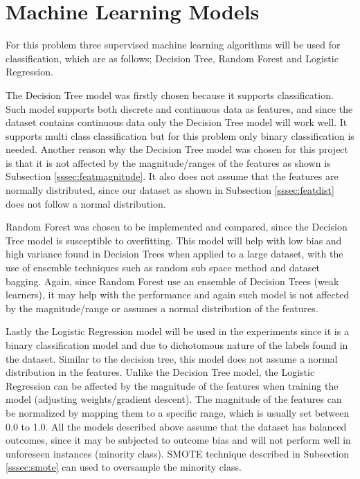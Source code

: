 \section{Machine Learning Models}\label{ssec:proposedmodels}
For this problem three supervised machine learning algorithms will be used for classification, which are as follows; Decision Tree, Random Forest and Logistic Regression.

\noindent The Decision Tree model was firstly chosen because it supports classification. Such model supports both discrete and continuous data as features, and since the dataset contains continuous data only the Decision Tree model will work well. It supports multi class classification but for this problem only binary classification is needed. Another reason why the Decision Tree model was chosen for this project is that it is not affected by the magnitude/ranges of the features as shown is Subsection \ref{sssec:featmagnitude}.  It also does not assume that the features are normally distributed, since our dataset as shown in Subsection \ref{sssec:featdist} does not follow a normal distribution. 

\noindent Random Forest was chosen to be implemented and compared, since the Decision Tree model is susceptible to overfitting. This model will help with low bias and high variance found in Decision Trees when applied to a large dataset, with the use of ensemble techniques such as random sub space method and dataset bagging. Again, since Random Forest use an ensemble of Decision Trees (weak learners), it may help with the performance and again such model is not affected by the magnitude/range or assumes a normal distribution of the features. 

\noindent Lastly the Logistic Regression model will be used in the experiments since it is a binary classification model and due to dichotomous nature of the labels found in the dataset. Similar to the decision tree, this model does not assume a normal distribution in the features. Unlike the Decision Tree model, the Logistic Regression can be affected by the magnitude of the features when training the model (adjusting weights/gradient descent). The magnitude of the features can be normalized by mapping them to a specific range, which is usually set between 0.0 to 1.0. All the models described above assume that the dataset has balanced outcomes, since it may be subjected to outcome bias and will not perform well in unforeseen instances (minority class). SMOTE technique described in Subsection \ref{sssec:smote} can used to oversample the minority class. 
